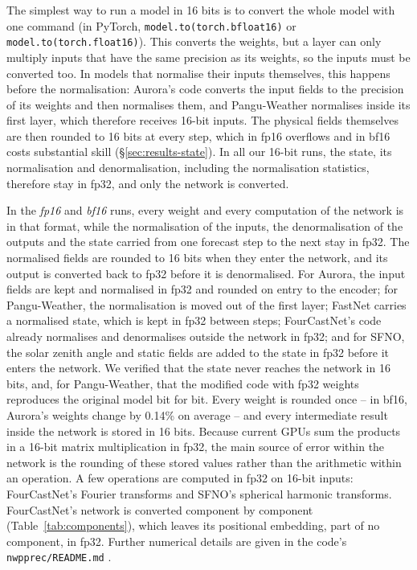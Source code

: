The simplest way to run a model in 16 bits is to convert the whole
model with one command (in PyTorch, \texttt{model.to(torch.bfloat16)} or
\texttt{model.to(torch.float16)}). This converts the weights, but a layer
can only multiply inputs that have the same precision as its weights, so
the inputs must be converted too. In models that normalise their inputs
themselves, this happens before the normalisation: Aurora's code
converts the input fields to the precision of its weights and then
normalises them, and Pangu-Weather normalises inside its first layer,
which therefore receives 16-bit inputs. The physical fields themselves
are then rounded to 16 bits at every step, which in fp16 overflows and in
bf16 costs substantial skill (\S\ref{sec:results-state}). In all our
16-bit runs, the state, its normalisation and denormalisation, including
the normalisation statistics, therefore stay in fp32, and only the
network is converted.

In the \emph{fp16} and \emph{bf16} runs, every weight and every
computation of the network is in that format, while the normalisation of
the inputs, the denormalisation of the outputs and the state carried from
one forecast step to the next stay in fp32. The normalised fields are rounded to 16
bits when they enter the network, and its output is converted back to
fp32 before it is denormalised. For Aurora, the input fields are kept and
normalised in fp32 and rounded on entry to the encoder; for
Pangu-Weather, the normalisation is moved out of the first layer; FastNet
carries a normalised state, which is kept in fp32 between steps;
FourCastNet's code already normalises and denormalises outside the
network in fp32; and for SFNO, the solar zenith angle and static fields
are added to the state in fp32 before it enters the network. We verified that the state never reaches the
network in 16 bits, and, for Pangu-Weather, that the modified code with
fp32 weights reproduces the original model bit for bit. Every weight is
rounded once -- in bf16, Aurora's weights change by 0.14\% on average --
and every intermediate result inside the network is stored in 16 bits.
Because current GPUs sum the products in a 16-bit matrix multiplication
in fp32, the main source of error within the network is the rounding of
these stored values rather than the arithmetic within an operation. A
few operations are computed in fp32 on 16-bit inputs: FourCastNet's
Fourier transforms and SFNO's spherical harmonic transforms. FourCastNet's network is converted component by
component (Table~\ref{tab:components}), which leaves its positional
embedding, part of no component, in fp32. Further numerical details are
given in the code's \texttt{nwpprec/README.md} \citep{siegert2026code}.

